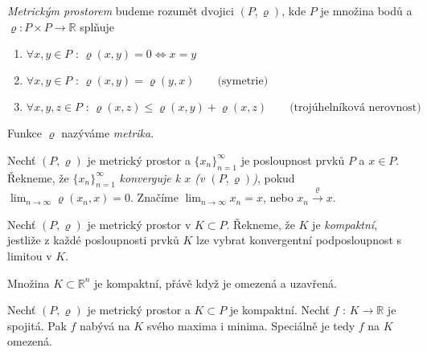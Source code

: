 \begin{definice}
\emph{Metrickým prostorem} budeme rozumět dvojici $(P, \varrho)$, kde $P$ je množina bodů a $\varrho : P \times P \rightarrow \mathbb{R}$ splňuje 

\begin{enumerate}
\item $\forall x,y \in P \textrm{ : } \varrho(x,y) = 0 \Leftrightarrow x = y$
\item $\forall x,y \in P \textrm{ : } \varrho(x,y) = \varrho(y,x) \qquad \textrm{(symetrie)}$
\item $\forall x,y,z \in P \textrm{ : } \varrho(x,z) \leq \varrho(x,y) + \varrho(x,z) \qquad \textrm{(trojúhelníková nerovnost)}$
\end{enumerate}
Funkce $\varrho$ nazýváme \emph{metrika}.
\end{definice}

\begin{definice}
Nechť $(P, \varrho)$ je metrický prostor a $\{ x_n \}_{n=1}^\infty$ je posloupnost prvků $P$ a $x \in P$. Řekneme, že $\{ x_n \}_{n=1}^{\infty}$ \emph{konverguje k $x$ (v $(P, \varrho)$)}, pokud $\lim_{n \rightarrow \infty} \varrho(x_n, x) = 0$. Značíme $\lim_{n \rightarrow \infty} x_n = x$, nebo $x_n \overset{\varrho}{\rightarrow} x$.
\end{definice}

\begin{definice}
Nechť $(P, \varrho)$ je metrický prostor v $K \subset P$. Řekneme, že $K$ je \emph{kompaktní}, jestliže z každé posloupnosti prvků $K$ lze vybrat konvergentní podposloupnost s limitou v $K$.
\end{definice}

\begin{vetabd}
Množina $K \subset \mathbb{R}^n$ je kompaktní, přávě když je omezená a uzavřená.
\end{vetabd}

\begin{vetal}
Nechť $(P, \varrho)$ je metrický prostor a $K \subset P$ je kompaktní. Nechť $f \textrm{ : } K \rightarrow \mathbb{R}$ je spojitá. Pak $f$ nabývá na $K$ svého maxima i minima. Speciálně je tedy $f$ na $K$ omezená.
\end{vetal}
